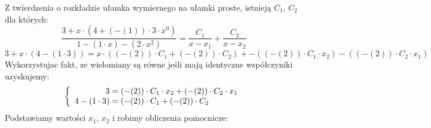 \documentclass[12pt]{article}
\begin{document}
Z twierdzenia o rozkładzie ułamka wymiernego na ułamki proste, istnieją $C_1$, $C_2$ dla których:\begin{equation}
\frac{ {3} + {x}\cdot({4} + (- ( {1} ) )\cdot{3}\cdot{x}^ {{0}}) }{ {1}- ( {1}\cdot{x} ) - ( {2}\cdot{x}^ {{2}} )  }  = \frac{C_1}{x-x_1}+\frac{C_2}{x-x_2}\end{equation}
\begin{equation}
{3} + {x}\cdot({4}- ( {1}\cdot{3} ) ) = {x}\cdot((- ( {2} ) )\cdot{{C}}_{{1}} + (- ( {2} ) )\cdot{{C}}_{{2}}) + - ( (- ( {2} ) )\cdot{{C}}_{{1}}\cdot{{x}}_{{2}} ) - ( (- ( {2} ) )\cdot{{C}}_{{2}}\cdot{{x}}_{{1}} )  \end{equation} 
Wykorzystujac fakt, ze wielomiany są równe jeśli mają identyczne współczyniki uzyskujemy: \begin{equation}\left\{\begin{array}{r@{\;=\;}l}{3}& (- ( {2} ) )\cdot{{C}}_{{1}}\cdot{{x}}_{{2}} + (- ( {2} ) )\cdot{{C}}_{{2}}\cdot{{x}}_{{1}} \\ {4}- ( {1}\cdot{3} )  & (- ( {2} ) )\cdot{{C}}_{{1}} + (- ( {2} ) )\cdot{{C}}_{{2}} \end{array}\right.\end{equation}Podstawiamy wartości $x_1$, $x_2$ i robimy obliczenia pomocnicze:
\end{document}

